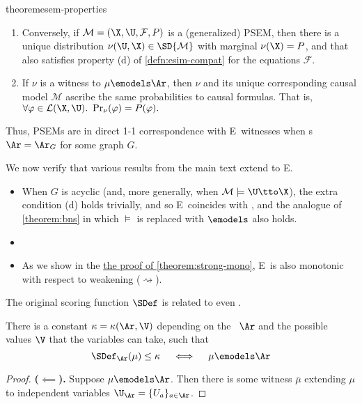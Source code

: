 \begin{subappendices}
{{\begin{linked}{theorem}{esem-properties}
\begin{enumerate}[wide,label={(\alph*)}]
    \item
    Conversely, if $\mathcal M = (\X,\U,\mathcal F, P)$ is a (generalized) PSEM, 
    then there is a unique distribution $\nu(\U,\X) \in \SD{\mathcal M}$
    with marginal $\nu(\X) = P$,
    and that also satisfies property (d) of \cref{defn:esim-compat} for the equations $\mathcal F$.
    \item
    If $\nu$ is a witness to $\mu \emodels \Ar$, then 
    $\nu$ and its unique corresponding causal model $\mathcal M$
    ascribe the same probabilities to causal formulas. That is,
    $
        \forall \varphi \in \mathcal L(\X,\U). ~
        \Pr_{\nu}(\varphi) = P(\varphi).
    $
    \end{enumerate}
\end{linked}
}%
Thus, PSEMs are in direct 1-1 correspondence with E\scibility\ witnesses when \hgraph s $\Ar = \Ar_G$ for some graph $G$.

We now verify that various results from the main text extend to E\Scibility. 
\begin{itemize}
    \item[{[\cref{theorem:bns}]}]
    When $G$ is acyclic
    (and, more generally, when $\mathcal M \models \U \tto \X$), 
    the extra condition (d) holds trivially, and so
    E\scibility\ coincides with \scibility, and the analogue of \cref{theorem:bns} in which $\models$ is replaced with $\emodels$ also holds. 
    
    \item [{$\vdots$}]
        
    \item[{[\cref{theorem:strong-mono}]}]
    As we show in the \hyperref[proof:strong-mono]{the proof of \cref*{theorem:strong-mono}}, E\Scibility\ is also monotonic with respect to weakening ($\rightsquigarrow$). 
\end{itemize}


The original scoring function $\SDef$ is related to even \scibility. 

\begin{conj}
    There is a constant $\kappa = \kappa(\Ar, \V)$ depending on the \hgraph\ $\Ar$ and the possible values $\V$ that the variables can take, such that
    \[
        \SDef_{\Ar}(\mu) \le \kappa
        \quad\iff\quad
        \mu \emodels \Ar  
    \] 
\end{conj}
\begin{proof}
    \textbf{($\impliedby$).}
    Suppose $\mu \emodels \Ar$. Then there is some witness $\bar\mu$ extending $\mu$ to independent variables $\U_\Ar = \{ U_a \}_{a \in \Ar}$. 


\end{proof}}
\end{subappendices}
